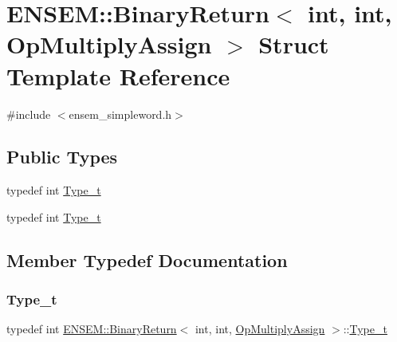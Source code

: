 \hypertarget{structENSEM_1_1BinaryReturn_3_01int_00_01int_00_01OpMultiplyAssign_01_4}{}\section{E\+N\+S\+EM\+:\+:Binary\+Return$<$ int, int, Op\+Multiply\+Assign $>$ Struct Template Reference}
\label{structENSEM_1_1BinaryReturn_3_01int_00_01int_00_01OpMultiplyAssign_01_4}


{\ttfamily \#include $<$ensem\+\_\+simpleword.\+h$>$}

\subsection*{Public Types}
\begin{DoxyCompactItemize}
\item 
typedef int \mbox{\hyperlink{structENSEM_1_1BinaryReturn_3_01int_00_01int_00_01OpMultiplyAssign_01_4_a7a8dcc18d85fb6a01288cb15f4bc4cdf}{Type\+\_\+t}}
\item 
typedef int \mbox{\hyperlink{structENSEM_1_1BinaryReturn_3_01int_00_01int_00_01OpMultiplyAssign_01_4_a7a8dcc18d85fb6a01288cb15f4bc4cdf}{Type\+\_\+t}}
\end{DoxyCompactItemize}


\subsection{Member Typedef Documentation}
\mbox{\label{structENSEM_1_1BinaryReturn_3_01int_00_01int_00_01OpMultiplyAssign_01_4_a7a8dcc18d85fb6a01288cb15f4bc4cdf}} 
\subsubsection{\texorpdfstring{Type\_t}{Type\_t}\hspace{0.1cm}{\footnotesize\ttfamily [1/2]}}
{\footnotesize\ttfamily typedef int \mbox{\hyperlink{structENSEM_1_1BinaryReturn}{E\+N\+S\+E\+M\+::\+Binary\+Return}}$<$ int, int, \mbox{\hyperlink{structENSEM_1_1OpMultiplyAssign}{Op\+Multiply\+Assign}} $>$\+::\mbox{\hyperlink{structENSEM_1_1BinaryReturn_3_01int_00_01int_00_01OpMultiplyAssign_01_4_a7a8dcc18d85fb6a01288cb15f4bc4cdf}{Type\+\_\+t}}}

